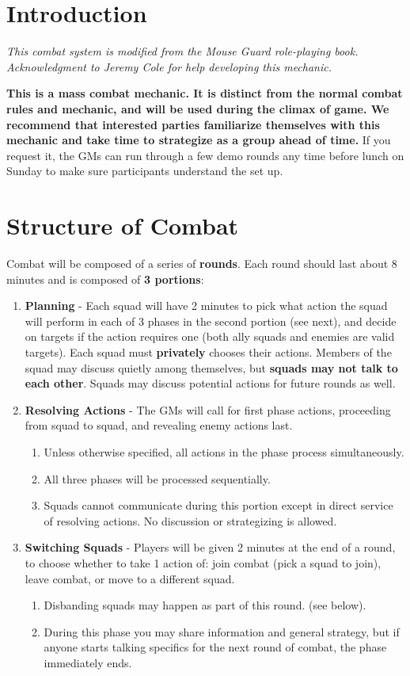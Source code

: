 \documentclass[green]{gl2018}
\begin{document}
\name{\gBattleStrategy{}}

\section*{Introduction}
\emph{This combat system is modified from the Mouse Guard role-playing book. Acknowledgment to Jeremy Cole for help developing this mechanic.}

{\bf This is a mass combat mechanic. It is distinct from the normal combat rules and mechanic, and will be used during the climax of game. We recommend that interested parties familiarize themselves with this mechanic and take time to strategize as a group ahead of time.} If you request it, the GMs can run through a few demo rounds any time before lunch on Sunday to make sure participants understand the set up.

\section*{Structure of Combat}

Combat will be composed of a series of {\bf rounds}. Each round should last about 8 minutes and is composed of {\bf 3 portions}:
\begin{enumerate}
	\item {\bf Planning} - Each squad will have 2 minutes to pick what action the squad will perform in each of 3 phases in the second portion (see next), and decide on targets if the action requires one (both ally squads and enemies are valid targets). Each squad must {\bf privately} chooses their actions. Members of the squad may discuss quietly among themselves, but {\bf squads may not talk to each other}. Squads may discuss potential actions for future rounds as well.
	\item {\bf Resolving Actions} - The GMs will call for first phase actions, proceeding from squad to squad, and revealing enemy actions last. 
	\begin{enumerate}
		\item Unless otherwise specified, all actions in the phase process simultaneously.
		\item All three phases will be processed sequentially.
		\item Squads cannot communicate during this portion except in direct service of resolving actions. No discussion or strategizing is allowed.
	\end{enumerate}
	\item {\bf Switching Squads} - Players will be given 2 minutes at the end of a round, to choose whether to take 1 action of: join combat (pick a squad to join), leave combat, or move to a different squad. 
	\begin{enumerate}
		\item Disbanding squads may happen as part of this round. (see below).
		\item During this phase you may share information and general strategy, but if anyone starts talking specifics for the next round of combat, the phase immediately ends.
	\end{enumerate}
\end{enumerate}
\end{document}
